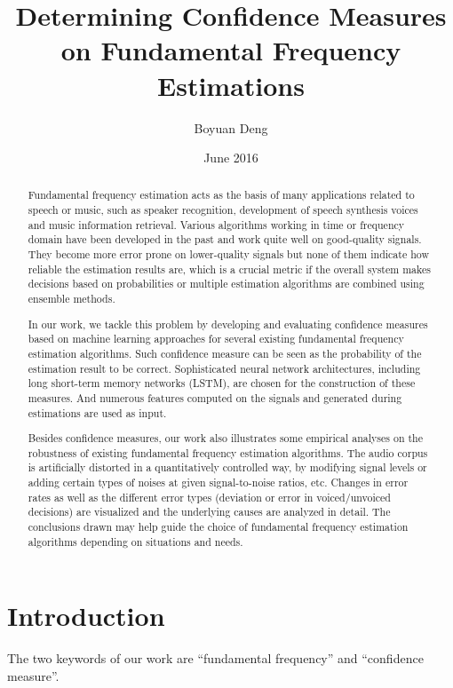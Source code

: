\documentclass[11pt,a4paper,titlepage]{article}
\title{Determining Confidence Measures on Fundamental Frequency Estimations}
\author{Boyuan Deng}
\date{June 2016}
\begin{document}
\maketitle



\begin{abstract}
Fundamental frequency estimation acts as the basis of many applications related to speech or music, such as speaker recognition, development of speech synthesis voices and music information retrieval.
Various algorithms working in time or frequency domain have been developed in the past and work quite well on good-quality signals.
They become more error prone on lower-quality signals but none of them indicate how reliable the estimation results are, which is a crucial metric if the overall system makes decisions based on probabilities or multiple estimation algorithms are combined using ensemble methods.

In our work, we tackle this problem by developing and evaluating confidence measures based on machine learning approaches for several existing fundamental frequency estimation algorithms.
Such confidence measure can be seen as the probability of the estimation result to be correct.
Sophisticated neural network architectures, including long short-term memory networks (LSTM), are chosen for the construction of these measures.
And numerous features computed on the signals and generated during estimations are used as input.

Besides confidence measures, our work also illustrates some empirical analyses on the robustness of existing fundamental frequency estimation algorithms.
The audio corpus is artificially distorted in a quantitatively controlled way, by modifying signal levels or adding certain types of noises at given signal-to-noise ratios, etc.
Changes in error rates as well as the different error types (deviation or error in voiced/unvoiced decisions) are visualized and the underlying causes are analyzed in detail.
The conclusions drawn may help guide the choice of fundamental frequency estimation algorithms depending on situations and needs.
\end{abstract}

\newpage
  \tableofcontents
\newpage

\section{Introduction}

The two keywords of our work are \enquote{fundamental frequency} and \enquote{confidence measure}.
\end{document}
